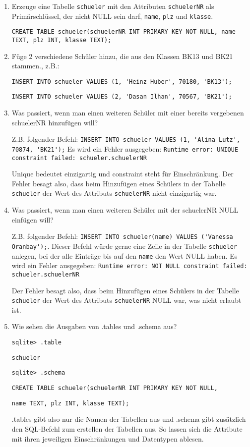 \begin{Answer}[ref=Befuellen]
	\begin{enumerate}
		\item Erzeuge eine Tabelle \lstinline!schueler! mit den Attributen \lstinline!schuelerNR! als Primärschlüssel, der nicht NULL sein darf, \lstinline!name!, \lstinline!plz! und \lstinline!klasse!.

		\lstinline[breaklines=true]!CREATE TABLE schueler(schuelerNR INT PRIMARY KEY NOT NULL, name TEXT, plz INT, klasse TEXT);!
		\item Füge 2 verschiedene Schüler hinzu, die aus den Klassen BK13 und BK21 stammen., z.B.:

		\lstinline!INSERT INTO schueler VALUES (1, 'Heinz Huber', 70180, 'BK13');!

		\lstinline!INSERT INTO schueler VALUES (2, 'Dasan Ilhan', 70567, 'BK21');!

		\item Was passiert, wenn man einen weiteren Schüler mit einer bereits vergebenen schuelerNR hinzufügen will?

		Z.B. folgender Befehl: \lstinline!INSERT INTO schueler VALUES (1, 'Alina Lutz', 70874, 'BK21');!
		Es wird ein Fehler ausgegeben: \lstinline!Runtime error: UNIQUE constraint failed: schueler.schuelerNR!

		Unique bedeutet einzigartig und constraint steht für Einschränkung. Der Fehler besagt also, dass beim Hinzufügen eines Schülers in der Tabelle \lstinline!schueler! der Wert des Attributs \lstinline!schuelerNR! nicht einzigartig war.
		\item Was passiert, wenn man einen weiteren Schüler mit der schuelerNR NULL einfügen will?

		Z.B. folgender Befehl: \lstinline!INSERT INTO schueler(name) VALUES ('Vanessa Oranbay');!. Dieser Befehl würde gerne eine Zeile in der Tabelle \lstinline!schueler! anlegen, bei der alle Einträge bis auf den \lstinline!name! den Wert NULL haben.
		Es wird ein Fehler ausgegeben: \lstinline!Runtime error: NOT NULL constraint failed: schueler.schuelerNR!

		Der Fehler besagt also, dass beim Hinzufügen eines Schülers in der Tabelle \lstinline!schueler! der Wert des Attributs \lstinline!schuelerNR! NULL war, was nicht erlaubt ist.
		\item Wie sehen die Ausgaben von .tables und .schema aus?

		\lstinline!sqlite> .table!

		\lstinline!schueler!

		\lstinline!sqlite> .schema!

		\lstinline!CREATE TABLE schueler(schuelerNR INT PRIMARY KEY NOT NULL,!

		\lstinline!name TEXT, plz INT, klasse TEXT);!

        .tables gibt also nur die Namen der Tabellen aus und .schema gibt zusätzlich den SQL-Befehl zum erstellen der Tabellen aus. So lassen sich die Attribute mit ihren jeweiligen Einschränkungen und Datentypen ablesen.
	\end{enumerate}
\end{Answer}